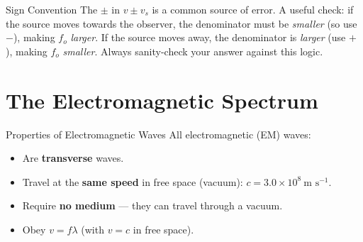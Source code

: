 \begin{warningbox}{Sign Convention}
The $\pm$ in $v \pm v_s$ is a common source of error. A useful check: if the source moves towards the observer, the denominator must be \emph{smaller} (so use $-$), making $f_o$ \emph{larger}. If the source moves away, the denominator is \emph{larger} (use $+$), making $f_o$ \emph{smaller}. Always sanity-check your answer against this logic.
\end{warningbox}

\section{The Electromagnetic Spectrum}

\begin{keybox}{Properties of Electromagnetic Waves}
All electromagnetic (EM) waves:
\begin{itemize}[itemsep=2pt]
  \item Are \textbf{transverse} waves.
  \item Travel at the \textbf{same speed} in free space (vacuum): $c = 3.0 \times 10^8\ \text{m s}^{-1}$.
  \item Require \textbf{no medium} — they can travel through a vacuum.
  \item Obey $v = f\lambda$ (with $v = c$ in free space).
\end{itemize}
\end{keybox}


